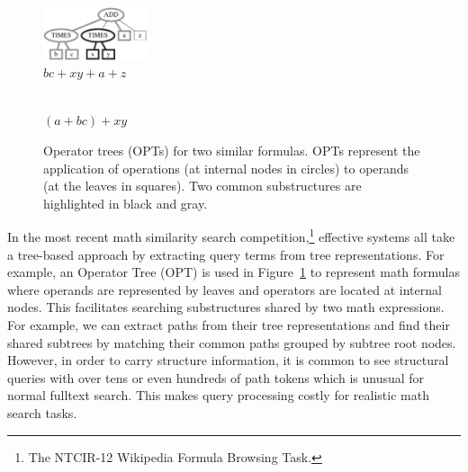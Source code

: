 \documentclass[runningheads]{llncs}
\begin{document}
\begin{figure}[!t]

\begin{center}
\begin{minipage}[b]{1.5in}
\begin{center}
\includegraphics[width=1.2in]{fig/tree3.eps}\\
$bc + xy + a + z$
\end{center}
\end{minipage}
\hspace*{.0in}
\begin{minipage}[b]{1.5in}
\begin{center}
\\
$(a + bc) + xy$
\end{center}
\end{minipage}
\end{center}

\caption{Operator trees (OPTs) for two similar formulas. OPTs represent the application of operations (at internal nodes in circles) to operands (at the leaves in squares). Two common substructures are highlighted in black and gray.}
\label{intro}
\end{figure}

In the most recent math similarity search competition,\footnote{The NTCIR-12 Wikipedia Formula Browsing Task.} effective systems all take a tree-based approach by extracting query terms from tree representations.
For example, an Operator Tree (OPT) is used in Figure~\ref{intro} to represent math formulas where operands are represented by leaves and operators are located at internal nodes.
This facilitates searching substructures shared by two math expressions. For example, we can extract paths from their tree representations and find their shared subtrees by matching their common paths grouped by subtree root nodes.
However, in order to carry structure information, it is common to see structural queries with over tens or even hundreds of path tokens which is unusual for normal fulltext search. This makes query processing costly for realistic math search tasks.
\end{document}
